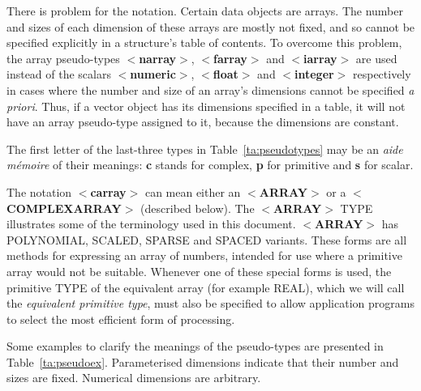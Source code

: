 \documentclass[twoside,11pt]{article}
\renewcommand{\_}{\texttt{\symbol{95}}}
\begin{document}
There is problem for the notation.
Certain data objects are arrays. The number and sizes of each dimension
of these arrays are mostly not fixed, and so cannot be specified explicitly
in a structure's table of contents.
To overcome this problem, the array pseudo-types
$<${\bf narray}$>$, $<${\bf farray}$>$
and $<${\bf iarray}$>$ are used instead of the scalars
$<${\bf numeric}$>$, $<${\bf float}$>$ and $<${\bf integer}$>$ respectively
in cases where the number and size of an array's dimensions cannot be
specified {\it a priori}.
Thus, if a vector object has its dimensions specified in a table,
it will not have an array pseudo-type assigned to it, because the 
dimensions are constant.

The first letter of the last-three types in Table~\ref{ta:pseudotypes}
may be an {\it aide m\'{e}moire} of their meanings: {\bf c} stands for
complex, {\bf p} for primitive and {\bf s} for scalar.

The notation $<${\bf c\_array}$>$ can mean either an $<${\bf ARRAY}$>$ or a
$<${\bf COMPLEX\_ARRAY}$>$ (described below). The \mbox{$<${\bf ARRAY}$>$} TYPE
illustrates some of the terminology used in this document.
\mbox{$<${\bf ARRAY}$>$} has
POLYNOMIAL, SCALED, SPARSE and SPACED variants.
These forms are all methods for expressing an array of numbers, intended
for use where a primitive array
would not be suitable.  Whenever one of
these special forms is used, the primitive TYPE of the
equivalent array (for example \_REAL), which we will call the
{\it equivalent primitive type}, must also
be specified to allow application programs to select the
most efficient form of processing.

Some examples to clarify the meanings of the pseudo-types are presented
in Table~\ref{ta:pseudoex}.
Parameterised dimensions indicate that their number and sizes are
fixed. Numerical dimensions are arbitrary.
\end{document}
